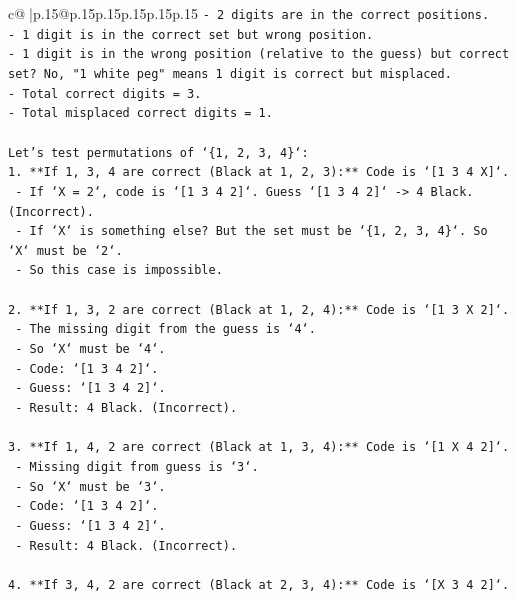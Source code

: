 \documentclass{article}
\begin{document}
{\begin{supertabular}{c@{$\;$}|p{.15\linewidth}@{}p{.15\linewidth}p{.15\linewidth}p{.15\linewidth}p{.15\linewidth}p{.15\linewidth}}
{{{\texttt{{-} 2 digits are in the correct positions.} \\
\texttt{{-} 1 digit is in the correct set but wrong position.} \\
\texttt{{-} 1 digit is in the wrong position (relative to the guess) but correct set? No, "1 white peg" means 1 digit is correct but misplaced.} \\
\texttt{{-} Total correct digits = 3.} \\
\texttt{{-} Total misplaced correct digits = 1.} \\
\\ 
\texttt{Let's test permutations of `\{1, 2, 3, 4\}`:} \\
\texttt{1.  **If 1, 3, 4 are correct (Black at 1, 2, 3):** Code is `{[}1 3 4 X{]}`.} \\
\texttt{    {-}   If `X = 2`, code is `{[}1 3 4 2{]}`. Guess `{[}1 3 4 2{]}` {-}> 4 Black. (Incorrect).} \\
\texttt{    {-}   If `X` is something else? But the set must be `\{1, 2, 3, 4\}`. So `X` must be `2`.} \\
\texttt{    {-}   So this case is impossible.} \\
\\ 
\texttt{2.  **If 1, 3, 2 are correct (Black at 1, 2, 4):** Code is `{[}1 3 X 2{]}`.} \\
\texttt{    {-}   The missing digit from the guess is `4`.} \\
\texttt{    {-}   So `X` must be `4`.} \\
\texttt{    {-}   Code: `{[}1 3 4 2{]}`.} \\
\texttt{    {-}   Guess: `{[}1 3 4 2{]}`.} \\
\texttt{    {-}   Result: 4 Black. (Incorrect).} \\
\\ 
\texttt{3.  **If 1, 4, 2 are correct (Black at 1, 3, 4):** Code is `{[}1 X 4 2{]}`.} \\
\texttt{    {-}   Missing digit from guess is `3`.} \\
\texttt{    {-}   So `X` must be `3`.} \\
\texttt{    {-}   Code: `{[}1 3 4 2{]}`.} \\
\texttt{    {-}   Guess: `{[}1 3 4 2{]}`.} \\
\texttt{    {-}   Result: 4 Black. (Incorrect).} \\
\\ 
\texttt{4.  **If 3, 4, 2 are correct (Black at 2, 3, 4):** Code is `{[}X 3 4 2{]}`.} \\
}}}
\end{supertabular}}
\end{document}
